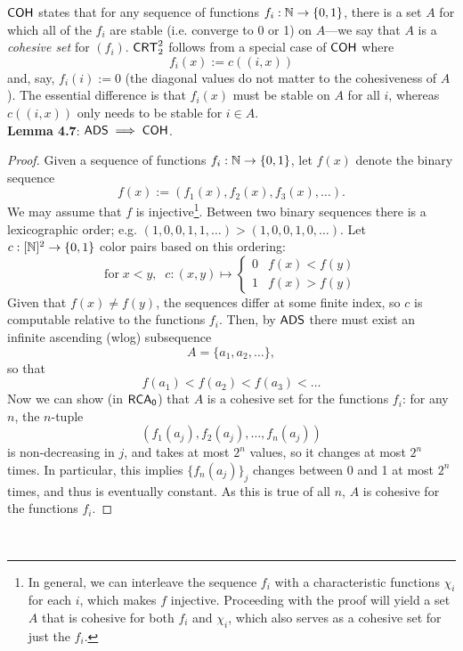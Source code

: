 \documentclass{amsart}
\begin{document}
	$\operatorname{\sf{COH}}$ states that for any sequence of functions $f_i:\mathbb{N}\to \{0,1\}$, there is a set $A$ for which all of the $f_i$ are stable (i.e. converge to 0 or 1) on $A$---we say that $A$ is a \textit{cohesive set} for $(f_i)$. $\operatorname{\sf{CRT}}^2_2$ follows from a special case of $\operatorname{\sf{COH}}$ where
	$$f_i(x):= c((i,x))$$
	and, say, $f_i(i):=0$ (the diagonal values do not matter to the cohesiveness of $A$). The essential difference is that $f_i(x)$ must be stable on $A$ for all $i$, whereas $c((i,x))$ only needs to be stable for $i\in A$. \\
	
	\noindent \textbf{Lemma 4.7}: $\operatorname{\sf{ADS}} \implies \sf{COH}$. 
	\begin{proof}
		Given a sequence of functions $f_i:\mathbb{N}\to \{0,1\}$, let $f(x)$ denote the binary sequence
		$$
		f(x) := (f_1(x),f_2(x),f_3(x),\dots).
		$$
		We may assume that $f$ is injective\footnote{In general, we can interleave the sequence $f_i$ with a characteristic functions $\chi_i$ for each $i$, which makes $f$ injective. Proceeding with the proof will yield a set $A$ that is cohesive for both $f_i$ and $\chi_i$, which also serves as a cohesive set for just the $f_i$.}. Between two binary sequences there is a lexicographic order; e.g. $(1,0,0,1,1,\dots) > (1,0,0,1,0,\dots)$. Let $c:[\mathbb{N}]^2\to \{0,1\}$ color pairs based on this ordering:
		$$
		\text{for} \; x<y, \;\; c: (x,y)\mapsto \begin{cases}
			0 & f(x) < f(y) \\
			1 & f(x) > f(y)
		\end{cases}
		$$
		Given that $f(x)\neq f(y)$, the sequences differ at some finite index, so $c$ is computable relative to the functions $f_i$. Then, by $\operatorname{\sf{ADS}}$ there must exist an infinite ascending (wlog) subsequence
		$$A = \{a_1,a_2,\dots\},$$
		so that 
		$$
		f(a_1) < f(a_2) < f(a_3) < \dots
		$$
		Now we can show (in $\operatorname{\sf{RCA_0}}$) that $A$ is a cohesive set for the functions $f_i$: for any $n$, the $n$-tuple
		$$(f_1(a_j),f_2(a_j),\dots,f_n(a_j))$$
		is non-decreasing in $j$, and takes at most $2^n$ values, so it changes at most $2^n$ times. In particular, this implies $\{f_n(a_j)\}_j$ changes between 0 and 1 at most $2^n$ times, and thus is eventually constant. As this is true of all $n$, $A$ is cohesive for the functions $f_i$.
	\end{proof}\\
	
\end{document}
